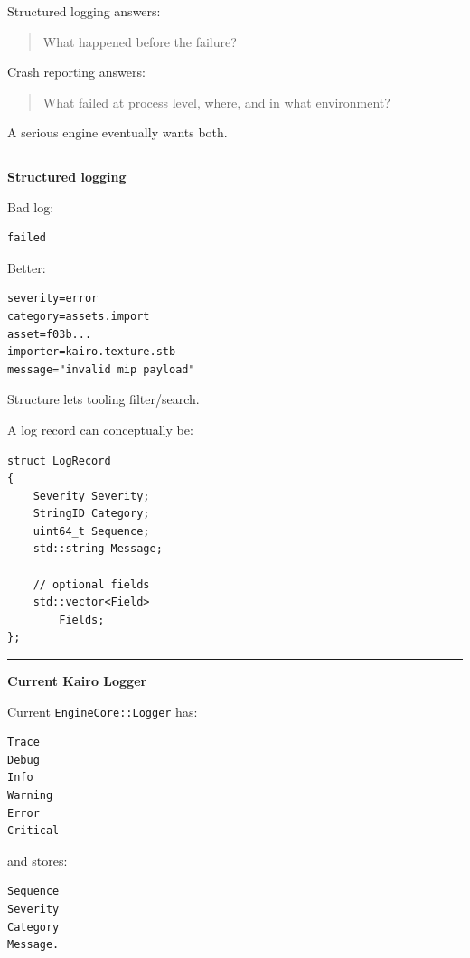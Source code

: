 Structured logging answers:

\begin{quote}
What happened before the failure?
\end{quote}

Crash reporting answers:

\begin{quote}
What failed at process level, where, and in what environment?
\end{quote}

A serious engine eventually wants both.

\begin{center}\rule{0.5\linewidth}{0.5pt}\end{center}

\textbf{Structured logging}

Bad log:

\begin{verbatim}
failed
\end{verbatim}

Better:

\begin{verbatim}
severity=error
category=assets.import
asset=f03b...
importer=kairo.texture.stb
message="invalid mip payload"
\end{verbatim}

Structure lets tooling filter/search.

A log record can conceptually be:

\begin{verbatim}
struct LogRecord
{
    Severity Severity;
    StringID Category;
    uint64_t Sequence;
    std::string Message;

    // optional fields
    std::vector<Field>
        Fields;
};
\end{verbatim}

\begin{center}\rule{0.5\linewidth}{0.5pt}\end{center}

\textbf{Current Kairo Logger}

Current \texttt{EngineCore::Logger} has:

\begin{verbatim}
Trace
Debug
Info
Warning
Error
Critical
\end{verbatim}

and stores:

\begin{verbatim}
Sequence
Severity
Category
Message.
\end{verbatim}

